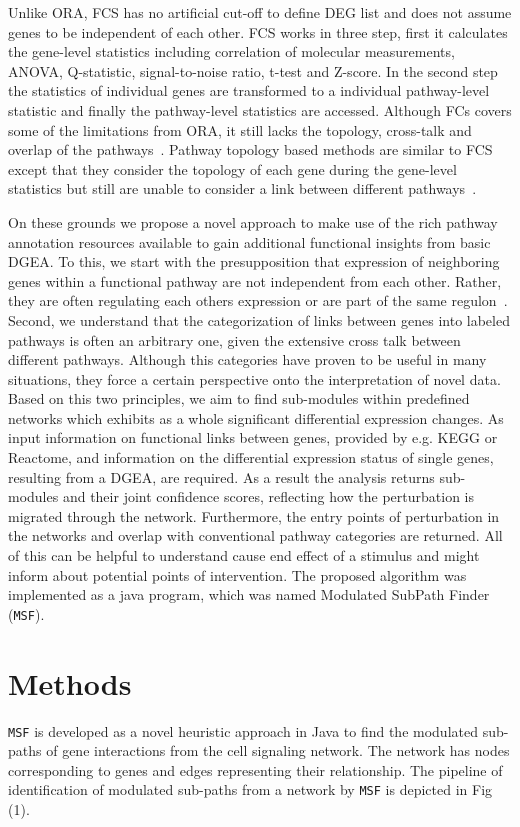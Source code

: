 \documentclass[twocolumn]{article}
\begin{document}
Unlike ORA, FCS has no artificial cut-off to define DEG list and does
not assume genes to be independent of each other. FCS works in three
step, first it calculates the gene-level statistics including correlation of molecular measurements, ANOVA, Q-statistic, signal-to-noise ratio, t-test and Z-score. In the second step the statistics of individual genes are transformed to a individual pathway-level statistic and finally the
pathway-level statistics are accessed. Although FCs covers some of the
limitations from ORA, it still lacks the topology, cross-talk and
overlap of the pathways~\cite{Khatri2012,Campos}. Pathway topology
based methods are similar to FCS except that they consider the
topology of each gene during the gene-level
statistics but still are unable to consider a link between different pathways~\cite{Khatri2012}.

On these grounds we propose a novel approach to make use of the rich
pathway annotation resources available to gain additional functional
insights from basic DGEA. To this, we
start with the presupposition that expression of neighboring genes
within a functional pathway are not independent from each
other. Rather, they are often regulating each others expression or are
part of the same regulon~\cite{Michalak}. Second, we
understand that the categorization of links between genes into labeled
pathways is often an arbitrary one, given the extensive cross talk
between different pathways. Although this categories have proven to be
useful in many situations, they force a certain perspective onto the
interpretation of novel data. Based on this two principles, we aim to
find sub-modules within predefined networks which exhibits as a whole
significant differential expression changes. As input information on
functional links between genes, provided by e.g. KEGG or Reactome, and
information on the differential expression status of single genes,
resulting from a DGEA, are required. As a result the analysis returns
sub-modules and their joint confidence scores, reflecting how the
perturbation is migrated through the network. Furthermore, the entry
points of perturbation in the networks and overlap with conventional
pathway categories are returned. All of this can be helpful to
understand cause end effect of a stimulus and might inform about
potential points of intervention. The proposed algorithm was
implemented as a java program, which was named Modulated SubPath
Finder (\texttt{MSF}).

\section*{Methods}
\texttt{MSF} is developed as a novel heuristic approach in Java to
find the modulated sub-paths of gene interactions from the cell
signaling network. The network has nodes corresponding to genes and
edges representing their relationship. The pipeline of identification
of modulated sub-paths from a network by \texttt{MSF} is depicted in
Fig (1).
\end{document}
